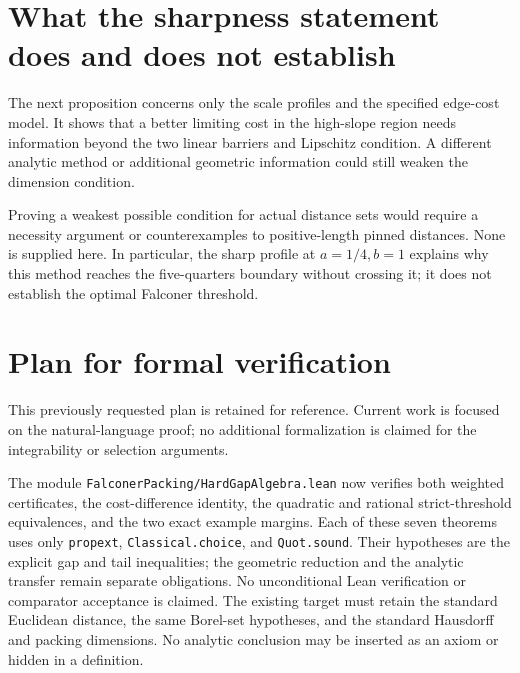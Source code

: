 \documentclass[11pt]{article}
\theoremstyle{definition}\newtheorem{remark}[theorem]{Remark}
\begin{document}
\clearpage



\clearpage










\section{What the sharpness statement does and does not establish}
The next proposition concerns only the scale profiles and the specified
edge-cost model. It shows that a better limiting cost in the high-slope
region needs information beyond the two linear barriers and Lipschitz
condition. A different analytic method or additional geometric information
could still weaken the dimension condition.



Proving a weakest possible condition for actual distance sets would require a
necessity argument or counterexamples to positive-length pinned distances.
None is supplied here. In particular, the sharp profile at \(a=1/4,b=1\)
explains why this method reaches the five-quarters boundary without crossing
it; it does not establish the optimal Falconer threshold.








\clearpage
\section{Plan for formal verification}
\begingroup\small
This previously requested plan is retained for reference. Current work is
focused on the natural-language proof; no additional formalization is claimed
for the integrability or selection arguments.

The module \texttt{FalconerPacking/HardGapAlgebra.lean} now verifies both
weighted certificates, the cost-difference identity, the quadratic and rational
strict-threshold equivalences, and the two exact example margins. Each of these
seven theorems uses only \texttt{propext}, \texttt{Classical.choice}, and
\texttt{Quot.sound}. Their hypotheses are the explicit gap and tail inequalities;
the geometric reduction and the analytic transfer remain separate obligations.
No unconditional Lean verification or comparator acceptance is claimed.
The existing target must retain the standard Euclidean distance, the same
Borel-set hypotheses, and the standard Hausdorff and packing dimensions.
No analytic conclusion may be inserted as an axiom or hidden in a definition.
\end{document}
